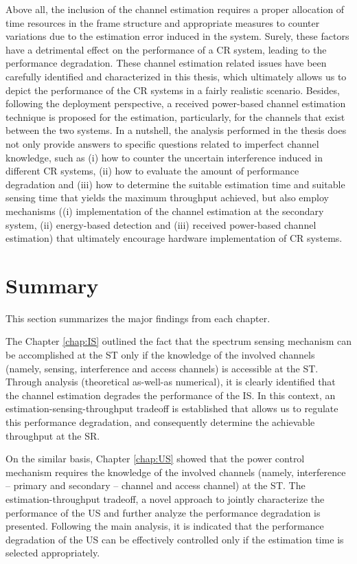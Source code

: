 Above all, the inclusion of the channel estimation requires a proper allocation of time resources in the frame structure and appropriate measures to counter variations due to the estimation error induced in the system. Surely, these factors have a detrimental effect on the performance of a CR system, leading to the performance degradation. These channel estimation related issues have been carefully identified and characterized in this thesis, which ultimately allows us to depict the performance of the CR systems in a fairly realistic scenario. Besides, following the deployment perspective, a received power-based channel estimation technique is proposed for the estimation, particularly, for the channels that exist between the two systems. In a nutshell, the analysis performed in the thesis does not only provide answers to specific questions related to imperfect channel knowledge, such as (i) how to counter the uncertain interference induced in different CR systems, (ii) how to evaluate the amount of performance degradation and (iii) how to determine the suitable estimation time and suitable sensing time that yields the maximum throughput achieved, but also employ mechanisms ((i) implementation of the channel estimation at the secondary system, (ii) energy-based detection and (iii) received power-based channel estimation) that ultimately encourage hardware implementation of CR systems. 


\section{Summary}
This section summarizes the major findings from each chapter. 

The Chapter \ref{chap:IS} outlined the fact that the spectrum sensing mechanism can be accomplished at the ST only if the knowledge of the involved channels (namely, sensing, interference and access channels) is accessible at the ST. Through analysis (theoretical as-well-as numerical), it is clearly identified that the channel estimation degrades the performance of the IS. In this context, an estimation-sensing-throughput tradeoff is established that allows us to regulate this performance degradation, and consequently determine the achievable throughput at the SR.

On the similar basis, Chapter \ref{chap:US} showed that the power control mechanism requires the knowledge of the involved channels (namely, interference -- primary and secondary -- channel and access channel) at the ST. The estimation-throughput tradeoff, a novel approach to jointly characterize the performance of the US and further analyze the performance degradation is presented. Following the main analysis, it is indicated that the performance degradation of the US can be effectively controlled only if the estimation time is selected appropriately.   

